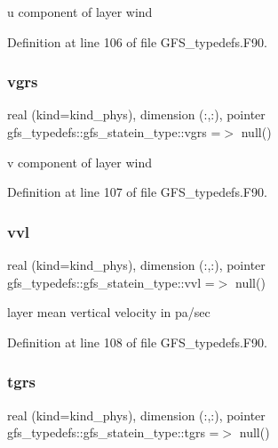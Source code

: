 u component of layer wind 



Definition at line 106 of file G\+F\+S\+\_\+typedefs.\+F90.

\mbox{\label{structgfs__typedefs_1_1gfs__statein__type_a87e66f3badfc5d919fadce2aac4676af}} 
\subsubsection{vgrs}
{\footnotesize\ttfamily real (kind=kind\+\_\+phys), dimension (\+:,\+:), pointer gfs\+\_\+typedefs\+::gfs\+\_\+statein\+\_\+type\+::vgrs =$>$ null()}



v component of layer wind 



Definition at line 107 of file G\+F\+S\+\_\+typedefs.\+F90.

\mbox{\label{structgfs__typedefs_1_1gfs__statein__type_a756f71b86accc2e644902c615208970d}} 
\subsubsection{vvl}
{\footnotesize\ttfamily real (kind=kind\+\_\+phys), dimension  (\+:,\+:), pointer gfs\+\_\+typedefs\+::gfs\+\_\+statein\+\_\+type\+::vvl =$>$ null()}



layer mean vertical velocity in pa/sec 



Definition at line 108 of file G\+F\+S\+\_\+typedefs.\+F90.

\mbox{\label{structgfs__typedefs_1_1gfs__statein__type_a37bfceb7760cb61adf9385b7bec5dc3e}} 
\subsubsection{tgrs}
{\footnotesize\ttfamily real (kind=kind\+\_\+phys), dimension (\+:,\+:), pointer gfs\+\_\+typedefs\+::gfs\+\_\+statein\+\_\+type\+::tgrs =$>$ null()}



